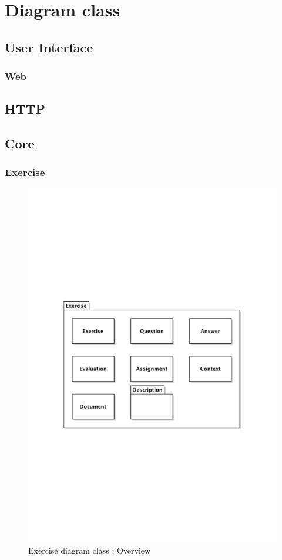 \chapter{Diagram class}

\section{User Interface}
		\subsection{Web}
		
	
\section{HTTP}
\newpage
\section{Core}
	\subsection{Exercise}
		\begin{figure}[ht]
			\begin{center}
				\includegraphics[width=\textwidth,  trim=2cm 9cm 2cm 9cm]{UML_figure/DC/core/exercise/DC_Exercise.pdf}
				\caption{Exercise diagram class : Overview}
			\end{center}
		\end{figure}
